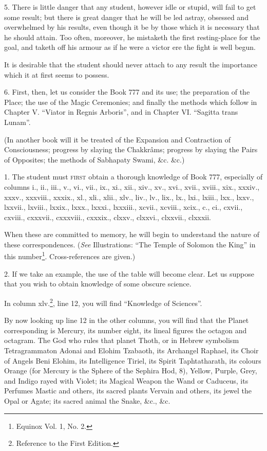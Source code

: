 5. There is little danger that any student, however idle or stupid, will fail to get some result; but there is great danger that he will be led astray, obsessed and overwhelmed by his results, even though it be by those which it is necessary that he should attain. Too often, moreover, he mistaketh the first resting-place for the goal, and taketh off his armour as if he were a victor ere the fight is well begun.

It is desirable that the student should never attach to any result the importance which it at first seems to possess.

6. First, then, let us consider the Book 777 and its use; the preparation of the Place; the use of the Magic Ceremonies; and finally the methods which follow in Chapter V. \enquote{Viator in Regnis Arboris}, and in Chapter VI. \enquote{Sagitta trans Lunam}.

(In another book will it be treated of the Expansion and Contraction of Consciousness; progress by slaying the Chakkr\^{a}ms; progress by slaying the Pairs of Opposites; the methods of Sabhapaty Swami, \&c. \&c.)


1. The student must \textsc{first} obtain a thorough knowledge of Book 777, especially of columns i., ii., iii., v., vi., vii., ix., xi., xii., xiv., xv., xvi., xvii., xviii., xix., xxxiv., xxxv., xxxviii., xxxix., xl., xli., xlii., xlv., liv., lv., lix., lx., lxi., lxiii., lxx., lxxv., lxxvii., lxviii., lxxix., lxxx., lxxxi., lxxxiii., xcvii., xcviii., xcix., c., ci., cxvii., cxviii., cxxxvii., cxxxviii., cxxxix., clxxv., clxxvi., clxxvii., clxxxii.

When these are committed to memory, he will begin to understand the nature of these correspondences. (\textit{See} Illustrations: \enquote{The Temple of Solomon the King} in this number\footnote{Equinox Vol. 1, No. 2.}. Cross-references are given.)

2. If we take an example, the use of the table will become clear. Let us suppose that you wish to obtain knowledge of some obscure science.

In column xlv.\footnote{Reference to the First Edition.}, line 12, you will find \enquote{Knowledge of Sciences}.

By now looking up line 12 in the other columns, you will find that the Planet corresponding is Mercury, its number eight, its lineal figures the octagon and octagram. The God who rules that planet Thoth, or in Hebrew symbolism Tetragrammaton Adonai and Elohim Tzabaoth, its Archangel Raphael, its Choir of Angels Beni Elohim, its Intelligence Tiriel, its Spirit Taphtatharath, its colours Orange (for Mercury is the Sphere of the Sephira Hod, 8), Yellow, Purple, Grey, and Indigo rayed with Violet; its Magical Weapon the Wand or Caduceus, its Perfumes Mastic and others, its sacred plants Vervain and others, its jewel the Opal or Agate; its sacred animal the Snake, \&c., \&c.


